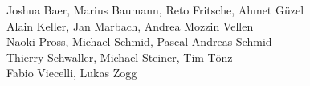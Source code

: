 %
%
%

Joshua Baer,                      %
Marius Baumann,                   %
Reto Fritsche,                    %
Ahmet Güzel%
\\
Alain Keller,                     %
Jan Marbach,                      %
Andrea Mozzin Vellen%
\\
Naoki Pross,                      %
Michael Schmid,                    %
Pascal Andreas Schmid%
\\
Thierry Schwaller,                %
Michael Steiner,                  %
Tim Tönz%
\\
Fabio Viecelli,                   %
Lukas Zogg%
